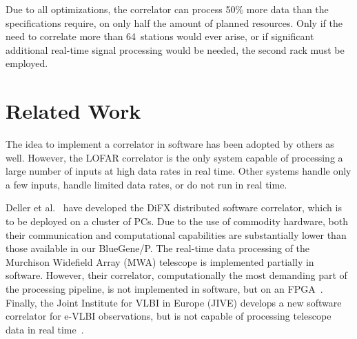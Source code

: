 \documentclass{sig-alternate}
\begin{document}
Due to all optimizations, the correlator can process 50\% more data than
the specifications require, on only half the amount of planned resources.
Only if the need to correlate more than 64~stations would ever arise, or if
significant additional real-time signal processing would be needed, the
second rack must be employed.


\section{Related Work}



The idea to implement a correlator in software has been adopted by others as
well.
However, the LOFAR correlator is the only system capable of processing a large
number of inputs at high data rates in real time.
Other systems handle only a few inputs, handle limited data rates, or do not
run in real time.

Deller et al.~\cite{Deller:07} have developed the DiFX distributed
software correlator, which is to be deployed on a cluster of PCs.
Due to the use of commodity hardware, both their communication and
computational capabilities are substantially lower than those available in
our BlueGene/P.
The real-time data processing of the Murchison Widefield Array (MWA) telescope
is implemented partially in software.
However, their correlator, computationally the most demanding part of the
processing pipeline, is not implemented in software, but on an
FPGA~\cite{Ord:08}.
Finally, the Joint Institute for VLBI in Europe (JIVE) develops a new software
correlator for e-VLBI observations, but is not capable of processing telescope
data in real time~\cite{Kruithof:08}.
\end{document}
